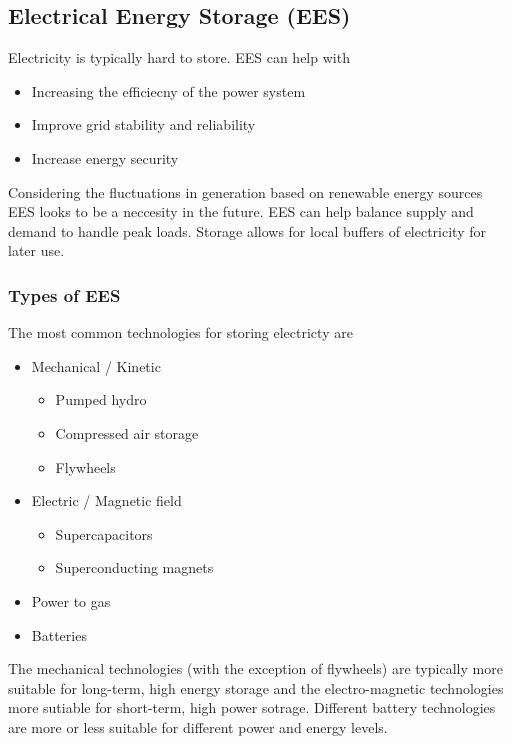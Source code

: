 \subsection{Electrical Energy Storage (EES)}
Electricity is typically hard to store. EES can help with
\begin{itemize}
    \item Increasing the efficiecny of the power system
    \item Improve grid stability and reliability
    \item Increase energy security
\end{itemize}
Considering the fluctuations in generation based on renewable energy sources EES looks to be a neccesity in the future.
EES can help balance supply and demand to handle peak loads.
Storage allows for local buffers of electricity for later use.

\subsubsection{Types of EES}
The most common technologies for storing electricty are

\begin{itemize}
    \item Mechanical / Kinetic
        \begin{itemize}
            \item Pumped hydro
            \item Compressed air storage
            \item Flywheels
        \end{itemize}
    \item Electric / Magnetic field
        \begin{itemize}
            \item Supercapacitors
            \item Superconducting magnets
        \end{itemize}
    \item Power to gas
    \item Batteries
\end{itemize}

The mechanical technologies (with the exception of flywheels) are typically more suitable for long-term, high energy storage and the electro-magnetic technologies more sutiable for short-term, high power sotrage.
Different battery technologies are more or less suitable for different power and energy levels.

